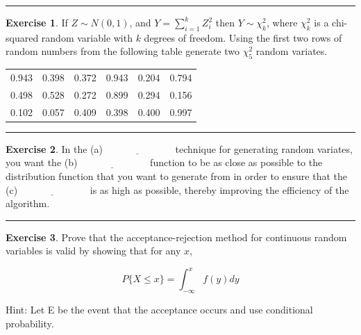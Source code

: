 \documentclass[
]{book}
\theoremstyle{definition}
\theoremstyle{definition}
\theoremstyle{definition}
\newtheorem{exercise}{Exercise}[chapter]
\theoremstyle{definition}
\theoremstyle{remark}
\begin{document}
\begin{center}\rule{0.5\linewidth}{0.5pt}\end{center}

\begin{exercise}
\protect\hypertarget{exr:AppRNRVP27}{}{\label{exr:AppRNRVP27} }If \(Z \sim N(0,1)\), and \(Y = \sum_{i=1}^k Z_i^2\) then \(Y \sim \chi_k^2\),
where \(\chi_k^2\) is a chi-squared random variable with \(k\) degrees of
freedom. Using the first two rows of random numbers from
the following table generate two \(\chi_5^2\) random variates.
\end{exercise}

\begin{longtable}[]{@{}cccccc@{}}
\toprule
\endhead
0.943 & 0.398 & 0.372 & 0.943 & 0.204 & 0.794 \\
0.498 & 0.528 & 0.272 & 0.899 & 0.294 & 0.156 \\
0.102 & 0.057 & 0.409 & 0.398 & 0.400 & 0.997 \\
\bottomrule
\end{longtable}

\begin{center}\rule{0.5\linewidth}{0.5pt}\end{center}

\begin{exercise}
\protect\hypertarget{exr:AppRNRVP28}{}{\label{exr:AppRNRVP28} }In the (a)\(\underline{\hspace{3cm}}\) technique for generating random
variates, you want the (b)\(\underline{\hspace{3cm}}\) function to be as
close as possible to the distribution function that you want to generate
from in order to ensure that the (c)\(\underline{\hspace{3cm}}\) is as
high as possible, thereby improving the efficiency of the algorithm.
\end{exercise}

\begin{center}\rule{0.5\linewidth}{0.5pt}\end{center}

\begin{exercise}
\protect\hypertarget{exr:AppRNRVP29}{}{\label{exr:AppRNRVP29} }Prove that the acceptance-rejection method for continuous random variables is valid by
showing that for any \(x\),

\[P\lbrace X \leq x \rbrace = \int_{-\infty}^x f(y)dy\]

Hint: Let E be the event that the acceptance occurs and use conditional
probability.
\end{exercise}
\end{document}
